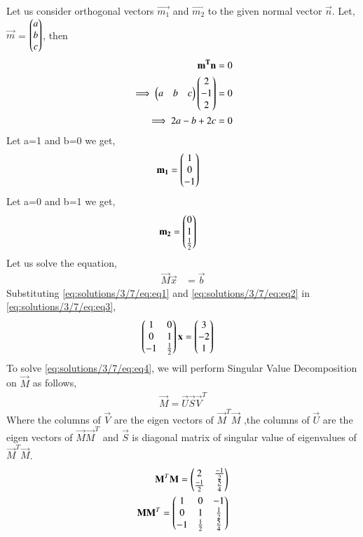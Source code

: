 Let us consider orthogonal vectors $\vec{m_1}$ and $\vec{m_2}$ to the given normal vector $\vec{n}$. Let, $\vec{m}$ = $\begin{pmatrix}a\\b\\c\end{pmatrix}$, then
\begin{align}
\mathbf{m^T}\mathbf{n} &= 0\\
\implies\begin{pmatrix}a&b&c\end{pmatrix}\begin{pmatrix}2\\-1\\2\end{pmatrix} &= 0\\
\implies2a-b+2c &= 0
\end{align}
Let a=1 and b=0 we get,
\begin{align}
\mathbf{m_1} &= \begin{pmatrix}1\\0\\-1\end{pmatrix} \label{eq:solutions/3/7/eq:eq1}
\end{align}
Let a=0 and b=1 we get,
\begin{align}
\mathbf{m_2} &= \begin{pmatrix}0\\1\\\frac{1}{2}\end{pmatrix} \label{eq:solutions/3/7/eq:eq2}
\end{align}
Let us solve the equation,
\begin{align}
\vec{M}\vec{x} &= \vec{b}\label{eq:solutions/3/7/eq:eq3}
\end{align}
Substituting \eqref{eq:solutions/3/7/eq:eq1} and \eqref{eq:solutions/3/7/eq:eq2} in \eqref{eq:solutions/3/7/eq:eq3},
\begin{align}
    \begin{pmatrix}1&0\\0&1\\-1&\frac{1}{2}\end{pmatrix}\mathbf{x} &= \begin{pmatrix}3\\-2\\1\end{pmatrix}\label{eq:solutions/3/7/eq:eq4}
\end{align}
To solve \eqref{eq:solutions/3/7/eq:eq4}, we will perform Singular Value Decomposition on $\vec{M}$ as follows,
\begin{align}
\vec{M}=\vec{U}\vec{S}\vec{V}^T\label{eq:solutions/3/7/eq:eq5}
\end{align}
Where the columns of $\vec{V}$ are the eigen vectors of $\vec{M}^T\vec{M}$ ,the columns of $\vec{U}$ are the eigen vectors of $\vec{M}\vec{M}^T$ and $\vec{S}$ is diagonal matrix of singular value of eigenvalues of $\vec{M}^T\vec{M}$.
\begin{align}
\mathbf{M}^T\mathbf{M}=\begin{pmatrix}2&\frac{-1}{2}\\\frac{-1}{2}&\frac{5}{4}\end{pmatrix}\label{eq:solutions/3/7/eq:eq6}\\
\mathbf{M}\mathbf{M}^T=\begin{pmatrix}1&0&-1\\0&1&\frac{1}{2}\\-1&\frac{1}{2}&\frac{5}{4}\end{pmatrix}
\end{align}
